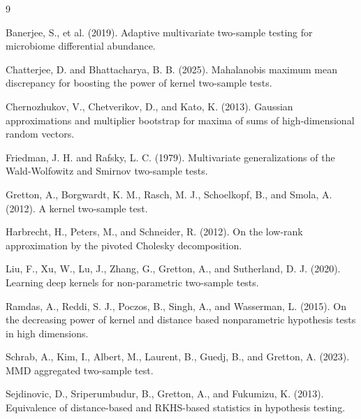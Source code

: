 \documentclass[12pt]{article}
\begin{document}
\begin{thebibliography}{9}

Banerjee, S., et al. (2019).
Adaptive multivariate two-sample testing for microbiome differential abundance.

Chatterjee, D. and Bhattacharya, B. B. (2025).
Mahalanobis maximum mean discrepancy for boosting the power of kernel two-sample tests.

Chernozhukov, V., Chetverikov, D., and Kato, K. (2013).
Gaussian approximations and multiplier bootstrap for maxima of sums of high-dimensional random vectors.

Friedman, J. H. and Rafsky, L. C. (1979).
Multivariate generalizations of the Wald-Wolfowitz and Smirnov two-sample tests.

Gretton, A., Borgwardt, K. M., Rasch, M. J., Schoelkopf, B., and Smola, A. (2012).
A kernel two-sample test.

Harbrecht, H., Peters, M., and Schneider, R. (2012).
On the low-rank approximation by the pivoted Cholesky decomposition.

Liu, F., Xu, W., Lu, J., Zhang, G., Gretton, A., and Sutherland, D. J. (2020).
Learning deep kernels for non-parametric two-sample tests.

Ramdas, A., Reddi, S. J., Poczos, B., Singh, A., and Wasserman, L. (2015).
On the decreasing power of kernel and distance based nonparametric hypothesis tests in high dimensions.

Schrab, A., Kim, I., Albert, M., Laurent, B., Guedj, B., and Gretton, A. (2023).
MMD aggregated two-sample test.

Sejdinovic, D., Sriperumbudur, B., Gretton, A., and Fukumizu, K. (2013).
Equivalence of distance-based and RKHS-based statistics in hypothesis testing.

\end{thebibliography}
\end{document}
